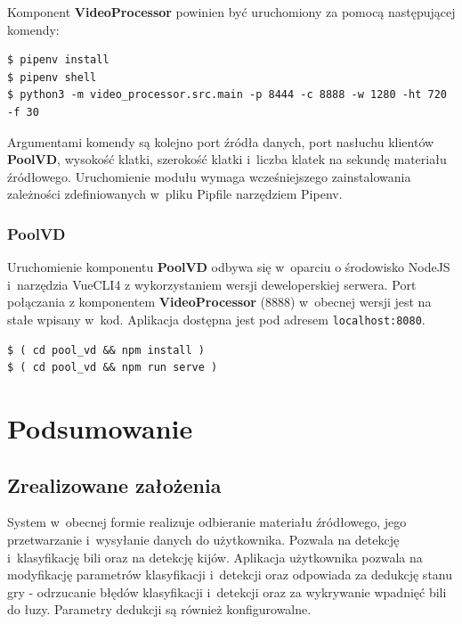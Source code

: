 \documentclass[12pt]{article}
\begin{document}
Komponent \textbf{VideoProcessor} powinien być uruchomiony za pomocą następującej komendy:

\begin{minipage}{\linewidth}

\begin{lstlisting}
$ pipenv install
$ pipenv shell
$ python3 -m video_processor.src.main -p 8444 -c 8888 -w 1280 -ht 720 -f 30
\end{lstlisting}
\end{minipage}

Argumentami komendy są kolejno port źródła danych, port nasłuchu klientów \textbf{PoolVD}, wysokość klatki, szerokość klatki i~liczba klatek na sekundę materiału źródłowego. Uruchomienie modułu wymaga wcześniejszego zainstalowania zależności zdefiniowanych w~pliku Pipfile narzędziem Pipenv.
\subsubsection{PoolVD}
Uruchomienie komponentu \textbf{PoolVD} odbywa się w~oparciu o środowisko NodeJS i~narzędzia VueCLI4 \cite{vuecli} z wykorzystaniem wersji deweloperskiej serwera. Port połączania z komponentem \textbf{VideoProcessor} (8888) w~obecnej wersji jest na stałe wpisany w~kod. Aplikacja dostępna jest pod adresem \lstinline{localhost:8080}.

\begin{minipage}{\linewidth}
\begin{lstlisting}
$ ( cd pool_vd && npm install )
$ ( cd pool_vd && npm run serve )
\end{lstlisting}
\end{minipage}

\section{Podsumowanie}

\subsection{Zrealizowane założenia}

System w~obecnej formie realizuje odbieranie materiału źródłowego, jego przetwarzanie i~wysyłanie danych do użytkownika. Pozwala na detekcję i~klasyfikację bili oraz na detekcję kijów. Aplikacja użytkownika pozwala na modyfikację parametrów klasyfikacji i~detekcji oraz odpowiada za dedukcję stanu gry - odrzucanie błędów klasyfikacji i~detekcji oraz za wykrywanie wpadnięć bili do łuzy. Parametry dedukcji są również konfigurowalne.
\end{document}

